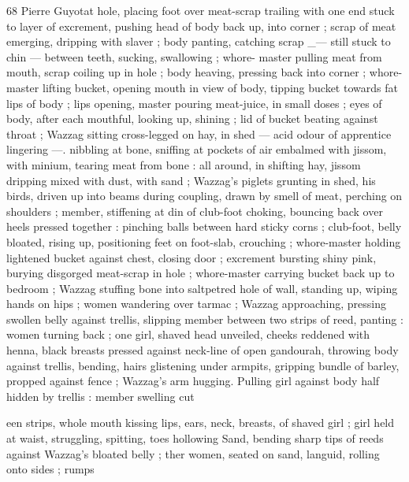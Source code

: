 68 Pierre Guyotat
hole, placing foot over meat-scrap trailing with one end stuck to layer
of excrement, pushing head of body back up, into corner ; scrap of
meat emerging, dripping with slaver ; body panting, catching scrap
_— still stuck to chin — between teeth, sucking, swallowing ; whore-
master pulling meat from mouth, scrap coiling up in hole ; body
heaving, pressing back into corner ; whore-master lifting bucket,
opening mouth in view of body, tipping bucket towards fat lips of
body ; lips opening, master pouring meat-juice, in small doses ; eyes
of body, after each mouthful, looking up, shining ; lid of bucket
beating against throat ; Wazzag sitting cross-legged on hay, in shed
— acid odour of apprentice lingering —. nibbling at bone, sniffing
at pockets of air embalmed with jissom, with minium, tearing meat
from bone : all around, in shifting hay, jissom dripping mixed with
dust, with sand ; Wazzag's piglets grunting in shed, his birds, driven
up into beams during coupling, drawn by smell of meat, perching on
shoulders ; member, stiffening at din of club-foot choking, bouncing
back over heels pressed together : pinching balls between hard
sticky corns ; club-foot, belly bloated, rising up, positioning feet on
foot-slab, crouching ; whore-master holding lightened bucket against
chest, closing door ; excrement bursting shiny pink, burying
disgorged meat-scrap in hole ; whore-master carrying bucket back
up to bedroom ; Wazzag stuffing bone into saltpetred hole of wall,
standing up, wiping hands on hips ; women wandering over tarmac ;
Wazzag approaching, pressing swollen belly against trellis, slipping
member between two strips of reed, panting : women turning back ;
one girl, shaved head unveiled, cheeks reddened with henna, black
breasts pressed against neck-line of open gandourah, throwing body
against trellis, bending, hairs glistening under armpits, gripping
bundle of barley, propped against fence ; Wazzag's arm hugging.
Pulling girl against body half hidden by trellis : member swelling cut

een strips, whole mouth kissing lips, ears, neck, breasts, of
shaved girl ; girl held at waist, struggling, spitting, toes hollowing
Sand, bending sharp tips of reeds against Wazzag’s bloated belly ;
ther women, seated on sand, languid, rolling onto sides ; rumps

